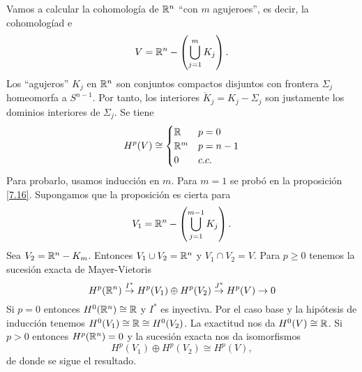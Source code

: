 \documentclass[CV.tex]{subfiles}
\begin{document}
\begin{ej}
Vamos a calcular la cohomología de $\mathbb{R}^n$ ``con $m$ agujeroes'', es decir, la cohomologíad e
\[
V=\mathbb{R}^n-\left(\bigcup_{j=1}^m K_j\right).
\]
Los ``agujeros'' $K_j$ en $\mathbb{R}^n$ son conjuntos compactos disjuntos con frontera $\Sigma_j$ homeomorfa a $S^{n-1}$. Por tanto, los interiores $\mathring{K}_j=K_j-\Sigma_j$ son justamente los dominios interiores de $\Sigma_j$. Se tiene
\[
H^p(V)\cong\begin{cases}
\mathbb{R} & p=0\\
\mathbb{R}^m & p=n-1\\
0 & c.c.
\end{cases}
\]
Para probarlo, usamos inducción en $m$. Para $m=1$ se probó en la proposición \ref{7.16}. Supongamos que la proposición es cierta para 
\[
V_1=\mathbb{R}^n-\left(\bigcup_{j=1}^{m-1}K_j\right).
\]
Sea $V_2=\mathbb{R}^n-K_m$. Entonces $V_1\cup V_2=\mathbb{R}^n$ y $V_1\cap V_2=V$. Para $p\geq 0$ tenemos la sucesión exacta de Mayer-Vietoris
\[
H^p(\mathbb{R}^n)\overset{I^*}{\to}H^p(V_1)\oplus H^p(V_2)\overset{J^*}{\to}H^p(V)\to 0 
\]
Si $p=0$ entonces $H^0(\mathbb{R}^n)\cong\mathbb{R}$ y $I^*$ es inyectiva. Por el caso base y la hipótesis de inducción tenemos $H^0(V_1)\cong\mathbb{R}\cong H^0(V_2)$. La exactitud nos da $H^0(V)\cong\mathbb{R}$. Si $p>0$ entonces $H^p(\mathbb{R}^n)=0$ y la sucesión exacta nos da isomorfismos 
\[
H^p(V_1)\oplus H^p(V_2)\cong H^p(V),
\]
de donde se sigue el resultado.
\end{ej}
\end{document}
